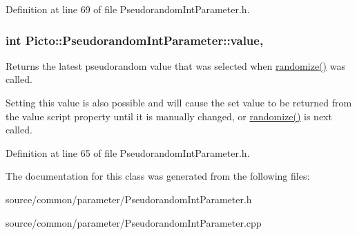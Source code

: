 Definition at line 69 of file Pseudorandom\-Int\-Parameter.\-h.

\hypertarget{class_picto_1_1_pseudorandom_int_parameter_a30d983370cae42e766a8290382459c90}{
\subsubsection[{value}]{\setlength{\rightskip}{0pt plus 5cm}int Picto\-::\-Pseudorandom\-Int\-Parameter\-::value\hspace{0.3cm}{\ttfamily [read]}, {\ttfamily [write]}}}\label{class_picto_1_1_pseudorandom_int_parameter_a30d983370cae42e766a8290382459c90}


Returns the latest pseudorandom value that was selected when \hyperlink{class_picto_1_1_pseudorandom_int_parameter_a77d69b74839fc19dd17b3b01b348a2c0}{randomize()} was called. 

Setting this value is also possible and will cause the set value to be returned from the value script property until it is manually changed, or \hyperlink{class_picto_1_1_pseudorandom_int_parameter_a77d69b74839fc19dd17b3b01b348a2c0}{randomize()} is next called. 

Definition at line 65 of file Pseudorandom\-Int\-Parameter.\-h.



The documentation for this class was generated from the following files\-:\begin{DoxyCompactItemize}
\item 
source/common/parameter/Pseudorandom\-Int\-Parameter.\-h\item 
source/common/parameter/Pseudorandom\-Int\-Parameter.\-cpp\end{DoxyCompactItemize}
